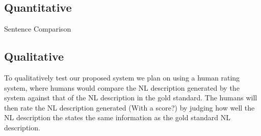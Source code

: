 \documentclass[letterpaper, 12 pt, conference]{ieeeconf}
\begin{document}
\subsection{Quantitative}

Sentence Comparison

\subsection{Qualitative}

To qualitatively test our proposed system we plan on using a human rating system, where humans would compare the NL description generated by the system against that of the NL description in the gold standard. The humans will then rate the NL description generated (With a score?) by judging how well the NL description the states the same information as the gold standard NL description.



\end{document}
